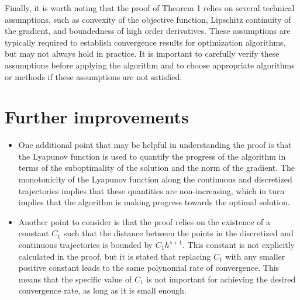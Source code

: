 \begin{itemizedot}
    \item Finally, it is worth noting that the proof of Theorem 1 relies on several technical assumptions, such as convexity of the objective function, Lipschitz continuity of the gradient, and boundedness of high order derivatives. These assumptions are typically required to establish convergence results for optimization algorithms, but may not always hold in practice. It is important to carefully verify these assumptions before applying the algorithm and to choose appropriate algorithms or methods if these assumptions are not satisfied.
     
 \end{itemizedot}
\newpage
\section{Further improvements}
\begin{itemize}
    \item One additional point that may be helpful in understanding the proof is that the Lyapunov function is used to quantify the progress of the algorithm in terms of the suboptimality of the solution and the norm of the gradient. The monotonicity of the Lyapunov function along the continuous and discretized trajectories implies that these quantities are non-increasing, which in turn implies that the algorithm is making progress towards the optimal solution.

    \item Another point to consider is that the proof relies on the existence of a constant $C_1$ such that the distance between the points in the discretized and continuous trajectories is bounded by $C_1 h^{s+1}$. This constant is not explicitly calculated in the proof, but it is stated that replacing $C_1$ with any smaller positive constant leads to the same polynomial rate of convergence. This means that the specific value of $C_1$ is not important for achieving the desired convergence rate, as long as it is small enough.
\end{itemize}


